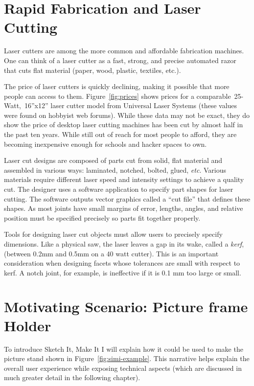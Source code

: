 \section{Rapid Fabrication and Laser Cutting}

Laser cutters are among the more common and affordable fabrication
machines. One can think of a laser cutter as a fast, strong, and
precise automated razor that cuts flat material (paper, wood, plastic,
textiles, etc.). 



The price of laser cutters is quickly declining, making it possible
that more people can access to them. Figure~\ref{fig:prices} shows
prices for a comparable~25-Watt,~16''x12'' laser cutter model from
Universal Laser Systems (these values were found on hobbyist web
forums). While these data may not be exact, they do show the price of
desktop laser cutting machines has been cut by almost half in the past
ten years. While still out of reach for most people to afford, they
are becoming inexpensive enough for schools and hacker spaces to own.

Laser cut designs are composed of parts cut from solid, flat material
and assembled in various ways: laminated, notched, bolted, glued,
\textit{etc}. Various materials require different laser speed and
intensity settings to achieve a quality cut. The designer uses a
software application to specify part shapes for laser cutting. The
software outputs vector graphics called a ``cut file'' that defines
these shapes. As most joints have small margins of error, lengths,
angles, and relative position must be specified precisely so parts fit
together properly.

Tools for designing laser cut objects must allow users to precisely
specify dimensions. Like a physical saw, the laser leaves a gap in its
wake, called a \textit{kerf}, (between 0.2mm and 0.5mm on a 40 watt
cutter). This is an important consideration when designing facets
whose tolerances are small with respect to kerf. A notch joint, for
example, is ineffective if it is 0.1 mm too large or small.

\section{Motivating Scenario: Picture frame Holder}



To introduce Sketch It, Make It I will explain how it could be used to
make the picture stand shown in Figure~\ref{fig:simi-example}. This
narrative helps explain the overall user experience while exposing
technical aspects (which are discussed in much greater detail in the
following chapter).


